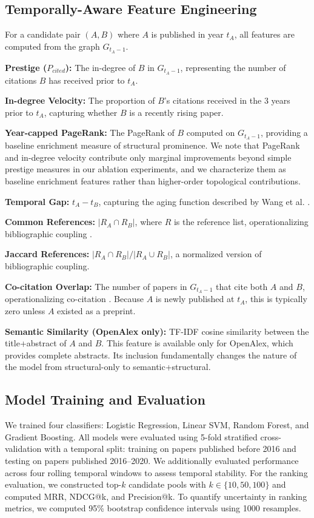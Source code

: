 \documentclass[11pt,a4paper]{article}
\begin{document}
\subsection{Temporally-Aware Feature Engineering}
For a candidate pair $(A, B)$ where $A$ is published in year $t_A$, all features are computed from the graph $G_{t_A-1}$.

\textbf{Prestige ($P_{cited}$):} The in-degree of $B$ in $G_{t_A-1}$, representing the number of citations $B$ has received prior to $t_A$.

\textbf{In-degree Velocity:} The proportion of $B$'s citations received in the 3 years prior to $t_A$, capturing whether $B$ is a recently rising paper.

\textbf{Year-capped PageRank:} The PageRank of $B$ computed on $G_{t_A-1}$, providing a baseline enrichment measure of structural prominence. We note that PageRank and in-degree velocity contribute only marginal improvements beyond simple prestige measures in our ablation experiments, and we characterize them as baseline enrichment features rather than higher-order topological contributions.

\textbf{Temporal Gap:} $t_A - t_B$, capturing the aging function described by Wang et al. \citep{wang2013quantifying}.

\textbf{Common References:} $|R_A \cap R_B|$, where $R$ is the reference list, operationalizing bibliographic coupling \citep{kessler1963bibliographic}.

\textbf{Jaccard References:} $|R_A \cap R_B| / |R_A \cup R_B|$, a normalized version of bibliographic coupling.

\textbf{Co-citation Overlap:} The number of papers in $G_{t_A-1}$ that cite both $A$ and $B$, operationalizing co-citation \citep{small1973co}. Because $A$ is newly published at $t_A$, this is typically zero unless $A$ existed as a preprint.

\textbf{Semantic Similarity (OpenAlex only):} TF-IDF cosine similarity between the title+abstract of $A$ and $B$. This feature is available only for OpenAlex, which provides complete abstracts. Its inclusion fundamentally changes the nature of the model from structural-only to semantic+structural.

\subsection{Model Training and Evaluation}
We trained four classifiers: Logistic Regression, Linear SVM, Random Forest, and Gradient Boosting. All models were evaluated using 5-fold stratified cross-validation with a temporal split: training on papers published before 2016 and testing on papers published 2016--2020. We additionally evaluated performance across four rolling temporal windows to assess temporal stability. For the ranking evaluation, we constructed top-$k$ candidate pools with $k \in \{10, 50, 100\}$ and computed MRR, NDCG@k, and Precision@k. To quantify uncertainty in ranking metrics, we computed 95\% bootstrap confidence intervals using 1000 resamples.
\end{document}

